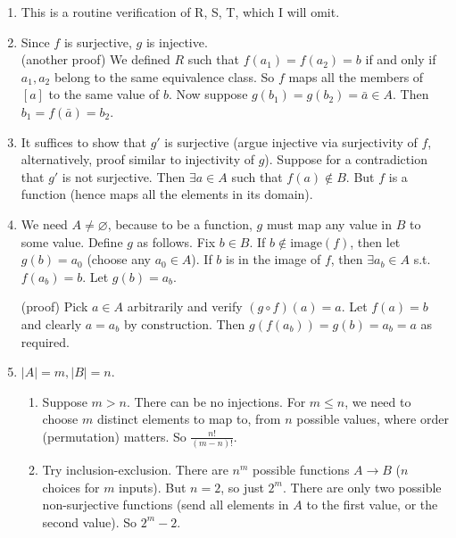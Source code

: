 \documentclass[10pt,a4paper]{article}
\begin{document}
\begin{enumerate}
    \item This is a routine verification of R, S, T, which I will omit.
    \item Since \(f\) is surjective, \(g\) is injective. \\
    (another proof) We defined \(R\) such that \( f(a_1) = f(a_2) = b \) 
    if and only if \(a_1, a_2\) belong to the same equivalence class. 
    So \(f\) maps all the members of \( [a] \) to the same value of \(b\).
    Now suppose \( g(b_1) = g(b_2) = \bar a \in A \). 
    Then \( b_1 = f(\bar a) = b_2 \).
    \item It suffices to show that \(g'\) is surjective 
    (argue injective via surjectivity of \(f\), 
    alternatively, proof similar to injectivity of \(g\)). 
    Suppose for a contradiction that \(g'\) is not surjective. 
    Then \( \exists a \in A \) such that \( f(a) \notin B \). 
    But \(f\) is a function (hence maps all the elements in its domain).

    \item We need \( A \ne \varnothing \), because to be a function, 
    \(g\) must map any value in \(B\) to some value.
    Define \(g\) as follows.  
    Fix \( b \in B \). If \( b \notin \mathrm{image} (f) \), 
    then let \( g(b) = a_0 \) (choose any \(a_0 \in A\)). 
    If \(b\) is in the image of \(f\), then 
    \( \exists a_b \in A \) s.t. \( f (a_b) = b \). 
    Let \( g(b) = a_b \).
    
    (proof) Pick \(a \in A\) arbitrarily and verify \( (g \circ f)(a) = a \).
    Let \( f(a) = b \) and clearly \(a = a_b\) by construction. 
    Then \( g ( f(a_b) ) = g(b) = a_b = a \) as required.

    \item \( |A| = m, |B| = n \).
    \begin{enumerate}
        \item Suppose \( m > n \). There can be no injections.
        For \( m \le n \), we need to choose \(m\) distinct elements to 
        map to, from \(n\) possible values, where order (permutation) matters. 
        So \( \frac{n!}{(m-n)!} \).

        \item Try inclusion-exclusion. There are \( n ^m \) possible 
        functions \( A \rightarrow B \) (\(n\) choices for \(m\) inputs). 
        But \( n = 2 \), so just \( 2 ^ m \). There are only two possible 
        non-surjective functions (send all elements in \(A\) to the first 
        value, or the second value). So \( 2 ^ m - 2 \).


\end{enumerate}
\end{enumerate}
\end{document}
